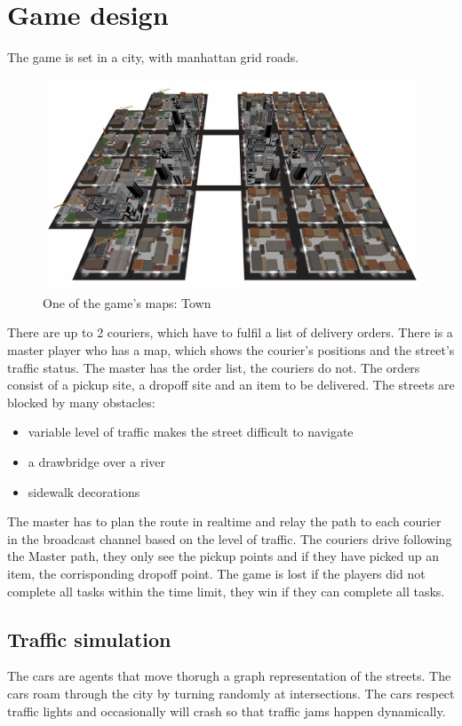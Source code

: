 \documentclass[12pt]{article}
\begin{document}
\clearpage

\section{Game design}
The game is set in a city, with manhattan grid roads.
\begin{figure}[H]
\includegraphics[width=\textwidth]{map_town}
\caption{One of the game's maps: Town}
\end{figure}
There are up to 2 couriers, which have to fulfil a list of delivery orders.
There is a master player who has a map, which shows the courier's positions and the street's traffic status. The master has the order list, the couriers do not.
The orders consist of a pickup site, a dropoff site and an item to be delivered.
The streets are blocked by many obstacles:
\begin{itemize}
  \item variable level of traffic makes the street difficult to navigate
  \item a drawbridge over a river
  \item sidewalk decorations
\end{itemize}
The master has to plan the route in realtime and relay the path to each courier in the broadcast channel based on the level of traffic.
The couriers drive following the Master path, they only see the pickup points and if they have picked up an item, the corrisponding dropoff point.
The game is lost if the players did not complete all tasks within the time limit, they win if they can complete all tasks.

\subsection{Traffic simulation}
The cars are agents that move thorugh a graph representation of the streets. The cars roam through the city by turning randomly at intersections. The cars respect traffic lights and occasionally will crash so that traffic jams happen dynamically.
\end{document}
